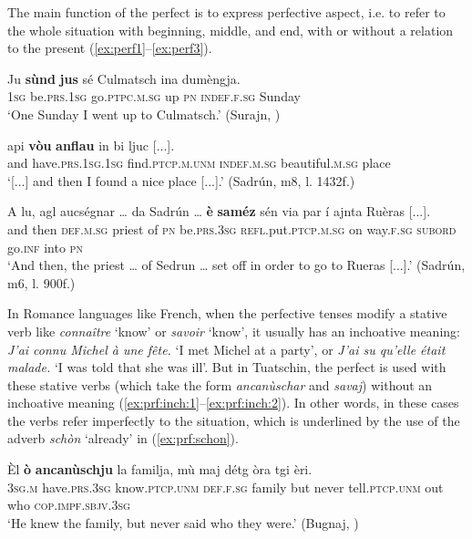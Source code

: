 The main function of the perfect is to express perfective aspect, i.e. to refer to the whole situation with beginning, middle, and end, with or without a relation to the present (\ref{ex:perf1}--\ref{ex:perf3}).

\ea\label{ex:perf1}
\gll    Ju \textbf{sùnd} \textbf{jus} sé Culmatsch ina dumèngja. \\
\textsc{1sg} be.\textsc{prs.1sg} go.\textsc{ptpc.m.sg} up \textsc{pn} \textsc{indef.f.sg} Sunday\\
\glt `One Sunday I went up to Culmatsch.' (Surajn, \citealt[128]{Büchli1966})
\z

\ea
\label{ex:perf2}
\gll  [...] api \textbf{vòu} \textbf{anflau} in bi ljuc [...].\\
 {} and have.\textsc{prs.1sg.1sg} find.\textsc{ptcp.m.unm} \textsc{indef.m.sg} beautiful.\textsc{m.sg} place\\
\glt `[...] and then I found a nice place [...].' (Sadrún, m8, l. 1432f.)
\z

\ea\label{ex:perf3}
\gll    A lu, agl aucségnar … da Sadrún … \textbf{è} \textbf{saméz} sén via par í ajnta Ruèras [...].\\
and then \textsc{def.m.sg} priest {} of \textsc{pn} {} be.\textsc{prs.3sg} \textsc{refl.}put.\textsc{ptcp.m.sg} on way.\textsc{f.sg} \textsc{subord} go.\textsc{inf} into \textsc{pn}\\
\glt `And then, the priest … of Sedrun … set off in order to go to Rueras [...].' (Sadrún, m6, l. 900f.)
\z

In Romance languages like French, when the perfective tenses modify a stative verb like \textit{connaître} `know' or \textit{savoir} `know', it usually has an inchoative meaning: \textit{J'ai connu Michel à une fête.} `I met Michel at a party', or \textit{J'ai su qu'elle était malade.} `I was told that she was ill'. But in Tuatschin, the perfect is used with these stative verbs (which take the form \textit{ancanùschar} and \textit{savaj}) without an inchoative meaning (\ref{ex:prf:inch:1}--\ref{ex:prf:inch:2}). In other words, in these cases the verbs refer imperfectly to the situation, which is underlined by the use of the adverb \textit{schòn} `already' in (\ref{ex:prf:schon}).

\ea\label{ex:prf:inch:1}
\gll    Èl \textbf{ò} \textbf{ancanùschju} la familja, mù maj détg òra tgi èri. \\
     \textsc{3sg.m} have.\textsc{prs.3sg} know.\textsc{ptcp.unm} \textsc{def.f.sg} family but never tell.\textsc{ptcp.unm} out who \textsc{cop.impf.sbjv.3sg}\\
\glt `He knew the family, but never said who they were.' (Bugnaj, \citealt[139]{Büchli1966})
\z

